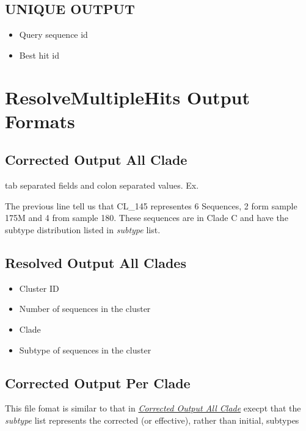 \documentclass[letterpaper,10pt,english]{sphinxmanual}
\begin{document}
\subsection{UNIQUE OUTPUT}
\label{defs:unique-output}\label{defs:uniqueout}\begin{itemize}
\item {} 
Query sequence id

\item {} 
Best hit id

\end{itemize}


\section{ResolveMultipleHits Output Formats}
\label{defs:resolvemultiplehits-output-formats}

\subsection{Corrected Output All Clade}
\label{defs:correctedall}\label{defs:corrected-output-all-clade}
tab separated fields and colon separated values. Ex.


The previous line tell us that CL\_145 representes 6 Sequences, 2 form sample 175M and 4 from sample 180. These sequences are in Clade C and have the subtype distribution listed in \emph{subtype} list.


\subsection{Resolved Output All Clades}
\label{defs:resolvedall}\label{defs:resolved-output-all-clades}\begin{itemize}
\item {} 
Cluster ID

\item {} 
Number of sequences in the cluster

\item {} 
Clade

\item {} 
Subtype of sequences in the cluster

\end{itemize}


\subsection{Corrected Output Per Clade}
\label{defs:correctedperclade}\label{defs:corrected-output-per-clade}
This file fomat is similar to that in {\hyperref[defs:correctedall]{\emph{Corrected Output All Clade}}} execpt that the \emph{subtype} list represents the corrected (or effective), rather than initial, subtypes
\end{document}
